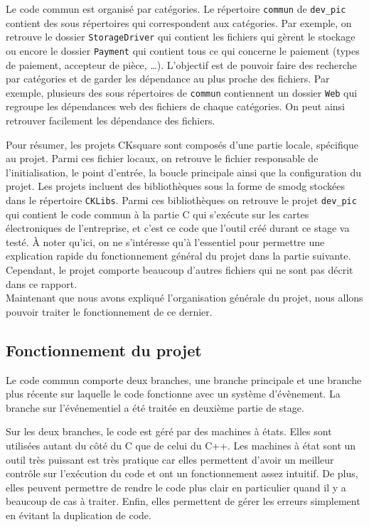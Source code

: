 \documentclass[a4paper]{article}
\begin{document}
Le code commun est organisé par catégories. Le répertoire \verb|commun| de
\verb|dev_pic| contient des sous répertoires qui correspondent aux
catégories. Par exemple, on retrouve le dossier \verb|StorageDriver| qui
contient les fichiers qui gèrent le stockage ou encore le dossier
\verb|Payment| qui contient tous ce qui concerne le paiement (types de
paiement, accepteur de pièce, \dots). L'objectif est de pouvoir faire des
recherche par catégories et de garder les dépendance au plus proche des
fichiers. Par exemple, plusieurs des sous répertoires de \verb|commun|
contiennent un dossier \verb|Web| qui regroupe les dépendances web des
fichiers de chaque catégories. On peut ainsi retrouver facilement les dépendance
des fichiers.

Pour résumer, les projets CKsquare sont composés d'une partie locale, spécifique
au projet. Parmi ces fichier locaux, on retrouve le fichier responsable de
l'initialisation, le point d'entrée, la boucle principale ainsi que la
configuration du projet. Les projets incluent des bibliothèques sous la forme de
\gls{smodg} stockées dans le répertoire \verb|CKLibs|. Parmi ces
bibliothèques on retrouve le projet \verb|dev_pic| qui contient le code
commun à la partie C qui s'exécute sur les cartes électroniques de l'entreprise,
et c'est ce code que l'outil créé durant ce stage va testé. À noter qu'ici, on
ne s'intéresse qu'à l'essentiel pour permettre une explication rapide du
fonctionnement général du projet dans la partie suivante. Cependant, le projet
comporte beaucoup d'autres fichiers qui ne sont pas décrit dans ce rapport.\\

Maintenant que nous avons expliqué l'organisation générale du projet, nous
allons pouvoir traiter le fonctionnement de ce dernier.

\subsection*{Fonctionnement du projet}

Le code commun comporte deux branches, une branche principale et une branche
plus récente sur laquelle le code fonctionne avec un système d'évènement. La
branche sur l'événementiel a été traitée en deuxième partie de stage.

Sur les deux branches, le code est géré par des machines à états. Elles sont
utilisées autant du côté du C que de celui du C++. Les machines à état sont un
outil très puissant est très pratique car elles permettent d'avoir un meilleur
contrôle sur l'exécution du code et ont un fonctionnement assez intuitif. De
plus, elles peuvent permettre de rendre le code plus clair en particulier quand
il y a beaucoup de cas à traiter. Enfin, elles permettent de gérer les erreurs
simplement en évitant la duplication de code.
\end{document}
